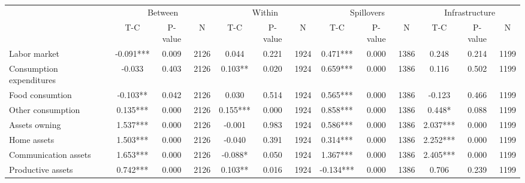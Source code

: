 
\begin{tabular}{l*{12}{c}}\hline&\multicolumn{3}{c}{Between}&\multicolumn{3}{c}{Within}&\multicolumn{3}{c}{Spillovers}&\multicolumn{3}{c}{Infrastructure} \\ \cmidrule(r){2-4}\cmidrule(l){5-7}\cmidrule(l){8-10}\cmidrule(l){9-13} & {T-C} & {P-value} & {N} & {T-C} & {P-value} & {N}  & {T-C} & {P-value} & {N} & {T-C} & {P-value} & {N} \\ \midrule

 Labor market &       -0.091*** &        0.009 & 2126    &        0.044 &        0.221 & 1924    &        0.471*** &        0.000 & 1386 &        0.248 &        0.214 & 1199 \\ 

 Consumption expenditures &       -0.033 &        0.403 & 2126    &        0.103** &        0.020 & 1924    &        0.659*** &        0.000 & 1386 &        0.116 &        0.502 & 1199 \\ 

 Food consumtion &       -0.103** &        0.042 & 2126    &        0.030 &        0.514 & 1924    &        0.565*** &        0.000 & 1386 &       -0.123 &        0.466 & 1199 \\ 

 Other consumption &        0.135*** &        0.000 & 2126    &        0.155*** &        0.000 & 1924    &        0.858*** &        0.000 & 1386 &        0.448* &        0.088 & 1199 \\ 

 Assets owning &        1.537*** &        0.000 & 2126    &       -0.001 &        0.983 & 1924    &        0.586*** &        0.000 & 1386 &        2.037*** &        0.000 & 1199 \\ 

 Home assets &        1.503*** &        0.000 & 2126    &       -0.040 &        0.391 & 1924    &        0.314*** &        0.000 & 1386 &        2.252*** &        0.000 & 1199 \\ 

 Communication assets &        1.653*** &        0.000 & 2126    &       -0.088* &        0.050 & 1924    &        1.367*** &        0.000 & 1386 &        2.405*** &        0.000 & 1199 \\ 

 Productive assets &        0.742*** &        0.000 & 2126    &        0.103** &        0.016 & 1924    &       -0.134*** &        0.000 & 1386 &        0.706 &        0.239 & 1199 \\ 


\end{tabular}
